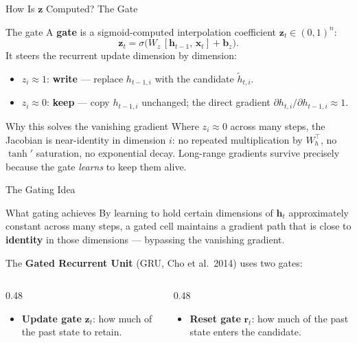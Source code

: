 \documentclass[aspectratio=169]{beamer}
\begin{document}
\begin{frame}{How Is $\boldsymbol{z}$ Computed? The Gate}

\begin{alertblock}{The gate}
  A \textbf{gate} is a sigmoid-computed interpolation coefficient $\boldsymbol{z}_t \in (0,1)^n$:
  \[
    \boldsymbol{z}_t = \sigma\!\bigl(W_z\,[\boldsymbol{h}_{t-1},\, \boldsymbol{x}_t] + \boldsymbol{b}_z\bigr).
  \]
  It steers the recurrent update dimension by dimension:
  \begin{itemize}
    \item $z_i \approx 1$: \textbf{write} — replace $h_{t-1,i}$ with the candidate $\tilde{h}_{t,i}$.
    \item $z_i \approx 0$: \textbf{keep} — copy $h_{t-1,i}$ unchanged;
      the direct gradient $\partial h_{t,i}/\partial h_{t-1,i} \approx 1$.
  \end{itemize}
\end{alertblock}

\medskip
\begin{block}{Why this solves the vanishing gradient}
  Where $z_i \approx 0$ across many steps, the Jacobian is near-identity in dimension $i$:
  no repeated multiplication by $W_h^{\top}$, no $\tanh'$ saturation, no exponential decay.
  Long-range gradients survive precisely because the gate \emph{learns} to keep them alive.
\end{block}

\end{frame}
%
%
\begin{frame}{The Gating Idea}
\vspace{0.15cm}
\begin{block}{What gating achieves}
By learning to hold certain dimensions of $\bm{h}_t$ approximately constant
across many steps, a gated cell maintains a gradient path that is close to
\textbf{identity} in those dimensions --- bypassing the vanishing gradient.
\end{block}

\vspace{0.15cm}
The \textbf{Gated Recurrent Unit} (GRU, Cho et al.\ 2014) uses two gates:
\begin{columns}[T]
\begin{column}{0.48\textwidth}
\begin{itemize}
    \item \textbf{Update gate} $\bm{z}_t$: how much of the past state to retain.
\end{itemize}
\end{column}
\begin{column}{0.48\textwidth}
\begin{itemize}
    \item \textbf{Reset gate} $\bm{r}_t$: how much of the past state enters the candidate.
\end{itemize}
\end{column}
\end{columns}
\end{frame}
\end{document}
